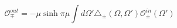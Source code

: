 \begin{equation}\label{CFTinout}
\mathcal{O}^{out}_{\mp}=
-\mu\sinh\pi\mu\int d\Omega'\triangle_{\pm}
(\Omega,\Omega')\mathcal{O}^{in}_{\pm}(\Omega') 
\end{equation}

